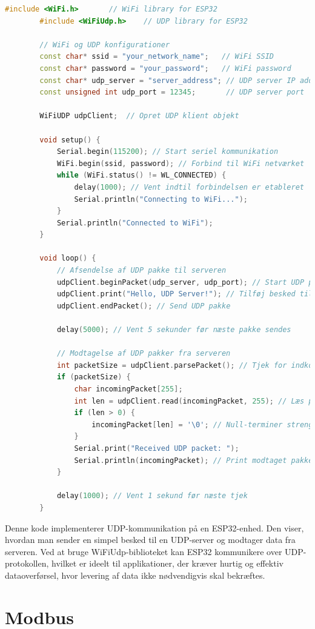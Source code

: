 \documentclass[12pt,a4paper]{book}
\begin{document}
	\begin{lstlisting}[language=C++, caption=ESP32 integration med UDP]
		#include <WiFi.h>       // WiFi library for ESP32
		#include <WiFiUdp.h>    // UDP library for ESP32
		
		// WiFi og UDP konfigurationer
		const char* ssid = "your_network_name";   // WiFi SSID
		const char* password = "your_password";   // WiFi password
		const char* udp_server = "server_address"; // UDP server IP address
		const unsigned int udp_port = 12345;       // UDP server port
		
		WiFiUDP udpClient;  // Opret UDP klient objekt
		
		void setup() {
			Serial.begin(115200); // Start seriel kommunikation
			WiFi.begin(ssid, password); // Forbind til WiFi netværket
			while (WiFi.status() != WL_CONNECTED) {
				delay(1000); // Vent indtil forbindelsen er etableret
				Serial.println("Connecting to WiFi...");
			}
			Serial.println("Connected to WiFi");
		}
		
		void loop() {
			// Afsendelse af UDP pakke til serveren
			udpClient.beginPacket(udp_server, udp_port); // Start UDP pakke
			udpClient.print("Hello, UDP Server!"); // Tilføj besked til pakken
			udpClient.endPacket(); // Send UDP pakke
			
			delay(5000); // Vent 5 sekunder før næste pakke sendes
			
			// Modtagelse af UDP pakker fra serveren
			int packetSize = udpClient.parsePacket(); // Tjek for indkommende pakke
			if (packetSize) {
				char incomingPacket[255];
				int len = udpClient.read(incomingPacket, 255); // Læs pakken ind i buffer
				if (len > 0) {
					incomingPacket[len] = '\0'; // Null-terminer streng
				}
				Serial.print("Received UDP packet: ");
				Serial.println(incomingPacket); // Print modtaget pakke
			}
			
			delay(1000); // Vent 1 sekund før næste tjek
		}
	\end{lstlisting}
	Denne kode implementerer UDP-kommunikation på en ESP32-enhed. Den viser, hvordan man sender en simpel besked til en UDP-server og modtager data fra serveren. Ved at bruge WiFiUdp-biblioteket kan ESP32 kommunikere over UDP-protokollen, hvilket er ideelt til applikationer, der kræver hurtig og effektiv dataoverførsel, hvor levering af data ikke nødvendigvis skal bekræftes.
	
	
	
	
	\chapter{Modbus}
\end{document}
